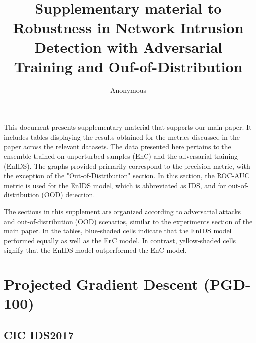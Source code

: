 \documentclass[conference]{IEEEtran}
\begin{document}
	
	
	\onecolumn
	\title{Supplementary material to Robustness in Network Intrusion Detection with Adversarial Training and Ouf-of-Distribution
	}
	
	\author{Anonymous}
		
	
	
	\maketitle
	
	This document presents supplementary material that supports our main paper. It includes tables displaying the results obtained for the metrics discussed in the paper across the relevant datasets. The data presented here pertains to the ensemble trained on unperturbed samples (EnC) and the adversarial training (EnIDS). The graphs provided primarily correspond to the precision metric, with the exception of the "Out-of-Distribution" section. In this section, the ROC-AUC metric is used for the EnIDS model, which is abbreviated as IDS, and for out-of-distribution (OOD) detection.
	
	The sections in this supplement are organized according to adversarial attacks and out-of-distribution (OOD) scenarios, similar to the experiments section of the main paper. In the tables, blue-shaded cells indicate that the EnIDS model performed equally as well as the EnC model. In contrast, yellow-shaded cells signify that the EnIDS model outperformed the EnC model.	
	
	
	
	\section{Projected Gradient Descent (PGD-100)}
	
	\subsection{CIC IDS2017}
	
\end{document}
